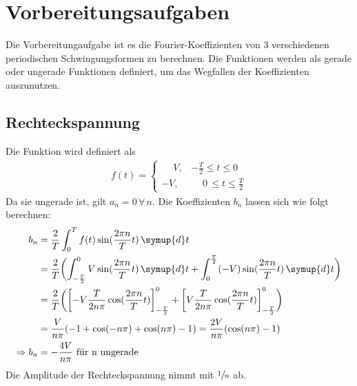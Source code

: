 \section{Vorbereitungsaufgaben}
Die Vorbereitungaufgabe ist es die Fourier-Koeffizienten von 3 verschiedenen periodischen Schwingungsformen zu berechnen.
Die Funktionen werden als gerade oder ungerade Funktionen definiert, um das Wegfallen der Koeffizienten auszunutzen.
\subsection{Rechteckspannung}
Die Funktion wird definiert als
\begin{align*}
    f(t) =
    \begin{cases}
        \phantom{-}V, & -\frac{T}{2}   \leq t  \leq 0 \\
        -V,           & \phantom{-}0 \,\leq t \leq \frac{T}{2}
    \end{cases}
\end{align*}
Da sie ungerade ist, gilt $a_n = 0  \, \forall \, n$.
Die Koeffizienten $b_n$ lassen sich wie folgt berechnen:
\begin{align*}
    b_n &= \frac{2}{T} \int_0^T f(t) \sin(\frac{2 \pi n}{T}t) \, \symup{d}t \\
        &= \frac{2}{T} \biggl( \int_{-\frac{T}{2}}^0 V \sin(\frac{2 \pi n}{T}t) \, \symup{d}t
                            + \int_{0}^{\frac{T}{2}} (-V) \sin(\frac{2 \pi n}{T}t) \, \symup{d}t \biggr) \\
        &= \frac{2}{T} \biggl( \left[-V \frac{T}{2n\pi} \cos(\frac{2 \pi n}{T}t) \right]_{-\frac{T}{2}}^0
                            + \left[V \frac{T}{2n\pi} \cos(\frac{2 \pi n}{T}t) \right]_{-\frac{T}{2}}^0 \biggr) \\
        &= \frac{V}{n\pi}(-1 + \cos(-n\pi)+ \cos(n\pi)-1) = \frac{2V}{n\pi} (\cos(n\pi)-1) \\
    \Rightarrow b_n &= - \frac{4V}{n\pi} \text{  für n ungerade}
\end{align*}
Die Amplitude der Rechteckspannung nimmt mit $\sfrac{1}{n}$ ab.

